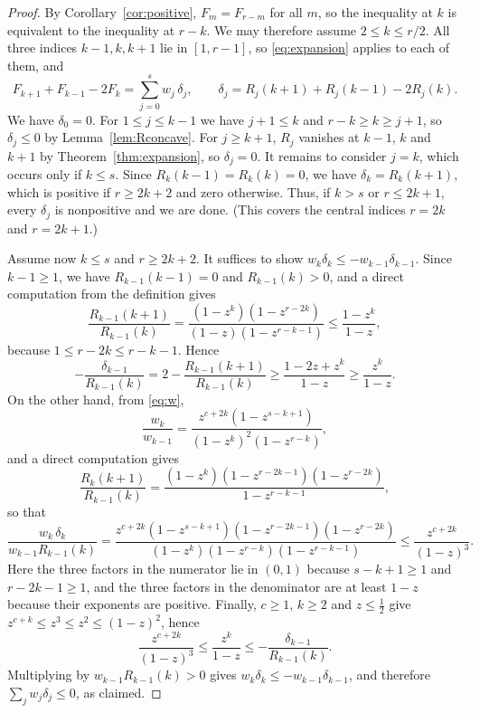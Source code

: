 \documentclass{amsart}
\theoremstyle{remark}
\numberwithin{equation}{section}
\begin{document}
\begin{proof}
By Corollary~\ref{cor:positive}, $F_m=F_{r-m}$ for all $m$, so the inequality at $k$ is equivalent to the inequality at $r-k$. We may therefore assume $2\le k\le r/2$. All three indices $k-1,k,k+1$ lie in $[1,r-1]$, so \eqref{eq:expansion} applies to each of them, and
\[
  F_{k+1}+F_{k-1}-2F_k=\sum_{j=0}^{s}w_j\,\delta_j,\qquad \delta_j=R_j(k+1)+R_j(k-1)-2R_j(k).
\]
We have $\delta_0=0$. For $1\le j\le k-1$ we have $j+1\le k$ and $r-k\ge k\ge j+1$, so $\delta_j\le0$ by Lemma~\ref{lem:Rconcave}. For $j\ge k+1$, $R_j$ vanishes at $k-1$, $k$ and $k+1$ by Theorem~\ref{thm:expansion}, so $\delta_j=0$. It remains to consider $j=k$, which occurs only if $k\le s$. Since $R_k(k-1)=R_k(k)=0$, we have $\delta_k=R_k(k+1)$, which is positive if $r\ge 2k+2$ and zero otherwise. Thus, if $k>s$ or $r\le2k+1$, every $\delta_j$ is nonpositive and we are done. (This covers the central indices $r=2k$ and $r=2k+1$.)

Assume now $k\le s$ and $r\ge2k+2$. It suffices to show $w_k\delta_k\le -w_{k-1}\delta_{k-1}$. Since $k-1\ge1$, we have $R_{k-1}(k-1)=0$ and $R_{k-1}(k)>0$, and a direct computation from the definition gives
\begin{equation}\label{eq:ratio1}
  \frac{R_{k-1}(k+1)}{R_{k-1}(k)}=\frac{(1-z^k)(1-z^{r-2k})}{(1-z)(1-z^{r-k-1})}\le\frac{1-z^k}{1-z},
\end{equation}
because $1\le r-2k\le r-k-1$. Hence
\[
  -\frac{\delta_{k-1}}{R_{k-1}(k)}=2-\frac{R_{k-1}(k+1)}{R_{k-1}(k)}\ge\frac{1-2z+z^k}{1-z}\ge\frac{z^k}{1-z}.
\]
On the other hand, from \eqref{eq:w},
\[
  \frac{w_k}{w_{k-1}}=\frac{z^{c+2k}(1-z^{s-k+1})}{(1-z^k)^2(1-z^{r-k})},
\]
and a direct computation gives
\[
  \frac{R_k(k+1)}{R_{k-1}(k)}=\frac{(1-z^k)(1-z^{r-2k-1})(1-z^{r-2k})}{1-z^{r-k-1}},
\]
so that
\[
  \frac{w_k\,\delta_k}{w_{k-1}R_{k-1}(k)}
  =\frac{z^{c+2k}(1-z^{s-k+1})(1-z^{r-2k-1})(1-z^{r-2k})}{(1-z^k)(1-z^{r-k})(1-z^{r-k-1})}
  \le\frac{z^{c+2k}}{(1-z)^3}.
\]
Here the three factors in the numerator lie in $(0,1)$ because $s-k+1\ge1$ and $r-2k-1\ge1$, and the three factors in the denominator are at least $1-z$ because their exponents are positive. Finally, $c\ge1$, $k\ge2$ and $z\le\frac12$ give $z^{c+k}\le z^3\le z^2\le(1-z)^2$, hence
\[
  \frac{z^{c+2k}}{(1-z)^3}\le\frac{z^k}{1-z}\le-\frac{\delta_{k-1}}{R_{k-1}(k)}.
\]
Multiplying by $w_{k-1}R_{k-1}(k)>0$ gives $w_k\delta_k\le-w_{k-1}\delta_{k-1}$, and therefore $\sum_jw_j\delta_j\le0$, as claimed.
\end{proof}
\end{document}
